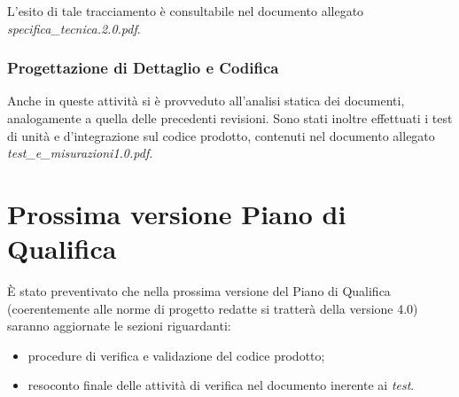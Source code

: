 L'esito di tale tracciamento è consultabile nel documento allegato \textit{specifica\_tecnica.2.0.pdf}.
\clearpage

\subsubsection {Progettazione di Dettaglio e Codifica}
Anche in queste attività si è provveduto all'analisi statica dei documenti, analogamente a quella delle precedenti revisioni.
Sono stati inoltre effettuati i test di unità e d'integrazione sul codice prodotto, contenuti nel documento allegato \textit{test\_e\_misurazioni1.0.pdf}.

\section{Prossima versione Piano di Qualifica}
È stato preventivato che nella prossima versione del Piano di Qualifica (coerentemente alle norme di progetto redatte si tratterà della versione 4.0) saranno aggiornate le sezioni riguardanti:
\begin{itemize}
\item procedure di verifica e validazione del codice prodotto;
\item resoconto finale delle attività di verifica nel documento inerente ai \textit{test}.
\end{itemize}


